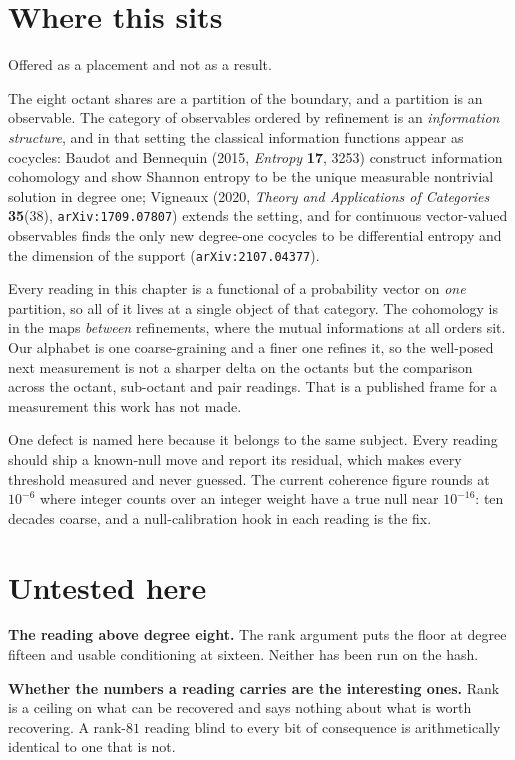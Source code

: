 \section{Where this sits}

Offered as a placement and not as a result.

The eight octant shares are a partition of the boundary, and a partition is an observable. The category of observables ordered by refinement is an \emph{information structure}, and in that setting the classical information functions appear as cocycles: Baudot and Bennequin (2015, \emph{Entropy} \textbf{17}, 3253) construct information cohomology and show Shannon entropy to be the unique measurable nontrivial solution in degree one; Vigneaux (2020, \emph{Theory and Applications of Categories} \textbf{35}(38), \texttt{arXiv:1709.07807}) extends the setting, and for continuous vector-valued observables finds the only new degree-one cocycles to be differential entropy and the dimension of the support (\texttt{arXiv:2107.04377}).

Every reading in this chapter is a functional of a probability vector on \emph{one} partition, so all of it lives at a single object of that category. The cohomology is in the maps \emph{between} refinements, where the mutual informations at all orders sit. Our alphabet is one coarse-graining and a finer one refines it, so the well-posed next measurement is not a sharper delta on the octants but the comparison across the octant, sub-octant and pair readings. That is a published frame for a measurement this work has not made.

One defect is named here because it belongs to the same subject. Every reading should ship a known-null move and report its residual, which makes every threshold measured and never guessed. The current coherence figure rounds at \(10^{-6}\) where integer counts over an integer weight have a true null near \(10^{-16}\): ten decades coarse, and a null-calibration hook in each reading is the fix.

\section{Untested here}

\textbf{The reading above degree eight.} The rank argument puts the floor at degree fifteen and usable conditioning at sixteen. Neither has been run on the hash.

\textbf{Whether the numbers a reading carries are the interesting ones.} Rank is a ceiling on what can be recovered and says nothing about what is worth recovering. A rank-\(81\) reading blind to every bit of consequence is arithmetically identical to one that is not.

